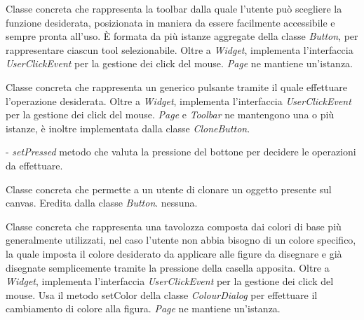 Classe concreta che rappresenta la toolbar dalla quale l'utente pu\` o scegliere la funzione desiderata, posizionata in maniera da essere facilmente accessibile e sempre pronta all'uso.
\` E formata da pi\` u istanze aggregate della classe \textit{Button}, per rappresentare ciascun tool selezionabile. Oltre a \textit{Widget}, implementa l'interfaccia \textit{UserClickEvent} per la gestione dei click del mouse. 
\textit{Page} ne mantiene un'istanza.

Classe concreta che rappresenta un generico pulsante tramite il quale effettuare l'operazione desiderata.
Oltre a \textit{Widget}, implementa l'interfaccia \textit{UserClickEvent} per la gestione dei click del mouse. 
\textit{Page} e \textit{Toolbar }ne mantengono una o pi\` u istanze, \` e inoltre implementata dalla classe \textit{CloneButton}.
\begin{elencopuntato}[\normindent]
\item[-]  \textit{setPressed} metodo che valuta la pressione del bottone per decidere le operazioni da effettuare.
\end{elencopuntato}

Classe concreta che permette a un utente di clonare un oggetto presente sul canvas.
Eredita dalla classe \textit{Button}.
nessuna.

Classe concreta che rappresenta una tavolozza composta dai colori di base pi\`u  generalmente utilizzati, nel caso l'utente non abbia bisogno di un colore specifico, la quale imposta il colore desiderato da applicare alle figure da disegnare e gi\` a disegnate semplicemente tramite la pressione della casella apposita.
Oltre a \textit{Widget}, implementa l'interfaccia \textit{UserClickEvent} per la gestione dei click del mouse. Usa il metodo setColor della classe \textit{ColourDialog} per effettuare il cambiamento di colore alla figura.
\textit{Page} ne mantiene un'istanza.

